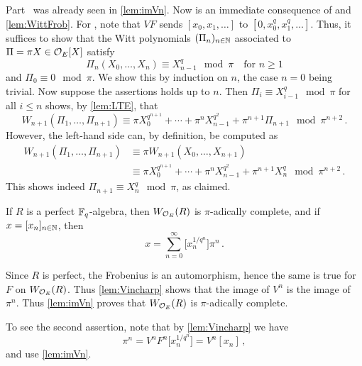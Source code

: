 \documentclass[a4paper, 10pt, oneside, DIV=9, chapterprefix=true, numbers=enddot,bibliography=totoc]{scrbook}
\begin{document}
\begin{proof*}
	Part~ was already seen in \cref{lem:imVn}. Now  is an immediate consequence of  and \cref{lem:WittFrob}. For , note that $VF$ sends $[x_0,x_1,\dotsc]$ to $[0,x_0^q,x_1^q,\dotsc]$. Thus, it suffices to show that the Witt polynomials $(\Pi_n)_{n\in\mathbb{N}}$ associated to $\Pi=\pi X\in\mathcal{O}_E[X]$ satisfy
	\begin{equation*}
		\Pi_n(X_0,\dotsc,X_n)\equiv X_{n-1}^q\mod \pi\quad\text{for }n\geq 1
	\end{equation*}
	and $\Pi_0\equiv 0\mod \pi$. We show this by induction on $n$, the case $n=0$ being trivial. Now suppose the assertions holds up to $n$. Then $\Pi_i\equiv X_{i-1}^q\mod \pi$ for all $i\leq n$ shows, by \cref{lem:LTE}, that
	\begin{equation*}
		W_{n+1}(\Pi_1,\dotsc,\Pi_{n+1})\equiv \pi X_0^{q^{n+1}}+\dotsb+\pi^{n}X_{n-1}^{q^2}+\pi^{n+1}\Pi_{n+1}\mod \pi^{n+2}\,.
	\end{equation*}
	However, the left-hand side can, by definition, be computed as
	\begin{align*}
		W_{n+1}(\Pi_1,\dotsc,\Pi_{n+1})&\equiv\pi W_{n+1}(X_0,\dotsc,X_{n+1})\\
		&\equiv \pi X_0^{q^{n+1}}+\dotsb+\pi^nX_{n-1}^{q^2}+\pi^{n+1}X_n^q\mod \pi^{n+2}\,.
	\end{align*}
	This shows indeed $\Pi_{n+1}\equiv X_n^q\mod \pi$, as claimed.
\end{proof*}
\begin{lem}\label{lem:W_OEpi}
	If $R$ is a perfect $\mathbb{F}_q$-algebra, then $W_{\mathcal{O}_E}(R)$ is $\pi$-adically complete, and if $x=[x_n]_{n\in\mathbb{N}}$, then
	\begin{equation*}
		x=\sum_{n=0}^\infty\big[x_n^{1/q^n}\big]\pi^n\,.
	\end{equation*}
\end{lem}
\begin{proof*}
	Since $R$ is perfect, the Frobenius is an automorphism, hence the same is true for $F$ on $W_{\mathcal{O}_E}(R)$. Thus \cref{lem:Vincharp} shows that the image of $V^n$ is the image of $\pi^n$. Thus \cref{lem:imVn} proves that $W_{\mathcal{O}_E}(R)$ is $\pi$-adically complete.
	
	To see the second assertion, note that by \cref{lem:Vincharp} we have
	\begin{equation*}
		[x_n]\pi^n=V^nF^n\big[x_n^{1/q^n}\big]=V^n[x_n]\,,
	\end{equation*}
	and use \cref{lem:imVn}.
\end{proof*}
\end{document}
